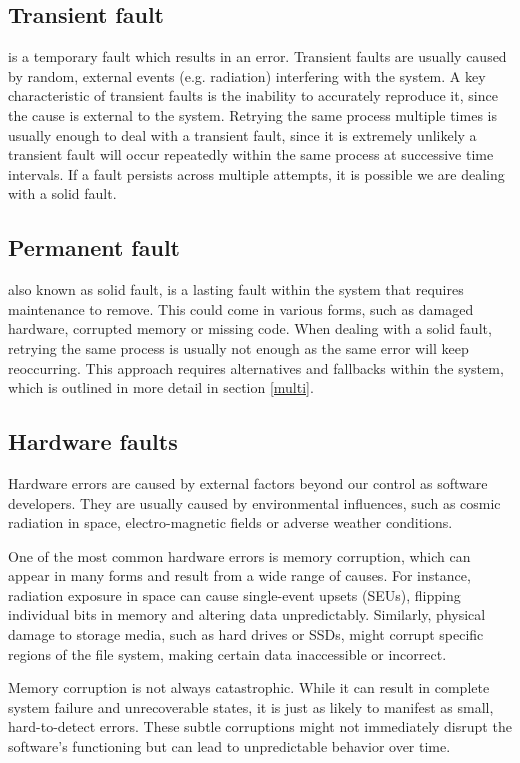 \documentclass[12pt, letterpaper]{article}
\begin{document}
\subsection{Transient fault} is a temporary fault which results in an error. Transient faults are usually caused by random, external events (e.g. radiation) interfering with the system. A key characteristic of transient faults is the inability to accurately reproduce it, since the cause is external to the system. Retrying the same process multiple times is usually enough to deal with a transient fault, since it is extremely unlikely a transient fault will occur repeatedly within the same process at successive time intervals. If a fault persists across multiple attempts, it is possible we are dealing with a solid fault. \\

\subsection{Permanent fault} also known as solid fault, is a lasting fault within the system that requires maintenance to remove. This could come in various forms, such as damaged hardware, corrupted memory or missing code. When dealing with a solid fault, retrying the same process is usually not enough as the same error will keep reoccurring. This approach requires alternatives and fallbacks within the system, which is outlined in more detail in section \ref{multi}. \\

\subsection{Hardware faults}

Hardware errors are caused by external factors beyond our control as software developers. They are usually caused by environmental influences, such as cosmic radiation in space, electro-magnetic fields or adverse weather conditions.

One of the most common hardware errors is memory corruption, which can appear in many forms and result from a wide range of causes. For instance, radiation exposure in space can cause single-event upsets (SEUs), flipping individual bits in memory and altering data unpredictably. Similarly, physical damage to storage media, such as hard drives or SSDs, might corrupt specific regions of the file system, making certain data inaccessible or incorrect.

Memory corruption is not always catastrophic. While it can result in complete system failure and unrecoverable states, it is just as likely to manifest as small, hard-to-detect errors. These subtle corruptions might not immediately disrupt the software's functioning but can lead to unpredictable behavior over time.
\end{document}
